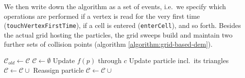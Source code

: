 We then write down the algorithm as a set of events, i.e.~we specify which
operations are performed if a vertex is read for the very first time \linebreak
(\texttt{touchVertexFirstTime}), if a cell is entered
(\texttt{enterCell}), and so forth.
Besides the actual grid hosting the particles, the grid sweeps build and
maintain two further sets of collision points (algorithm \ref{algorithm:grid-based-dem}).


\begin{algorithmic}[1]
   \State $\mathcal{C}_{old} \gets \mathcal{C}$
   \State $\mathcal{C} \gets \emptyset$
       \State Update $f(p)$ through $c$
      \EndFor
      \State Update particle incl.~its triangles
     \EndFor
       \State $\mathcal{C} \gets \mathcal{C} \cup $
     \EndFor
    \EndIf
        \State Reassign particle
       \EndIf
      \EndFor
     \EndFor
      \State $\mathcal{C} \gets \mathcal{C} \cup $
     \EndFor
    \EndIf
   \EndWhile
  \EndFunction

  
 \label{algorithm:grid-based-dem}
\end{algorithmic}


